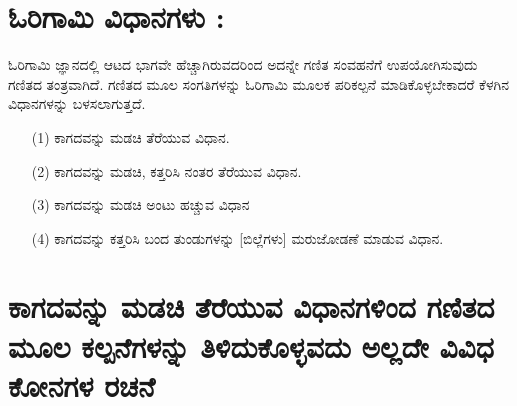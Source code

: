 \section{ಓರಿಗಾಮಿ ವಿಧಾನಗಳು : }\label{sec1.7} %
ಓರಿಗಾಮಿ ಜ್ಞಾನದಲ್ಲಿ ಆಟದ ಭಾಗವೇ ಹೆಚ್ಚಾಗಿರುವದರಿಂದ ಅದನ್ನೇ ಗಣಿತ ಸಂವಹನೆಗೆ ಉಪಯೋಗಿಸುವುದು ಗಣಿತದ ತಂತ್ರವಾಗಿದೆ. ಗಣಿತದ ಮೂಲ ಸಂಗತಿಗಳನ್ನು ಓರಿಗಾಮಿ ಮೂಲಕ ಪರಿಕಲ್ಪನೆ ಮಾಡಿಕೊಳ್ಳಬೇಕಾದರೆ ಕೆಳಗಿನ ವಿಧಾನಗಳನ್ನು ಬಳಸಲಾಗುತ್ತದೆ. 
\smallskip
\begin{itemize}
\item[(1)] ಕಾಗದವನ್ನು ಮಡಚಿ ತೆರೆಯುವ ವಿಧಾನ.
\smallskip
\item[(2)] ಕಾಗದವನ್ನು ಮಡಚಿ, ಕತ್ತರಿಸಿ ನಂತರ ತೆರೆಯುವ ವಿಧಾನ.
\smallskip
\item[(3)] ಕಾಗದವನ್ನು ಮಡಚಿ ಅಂಟು ಹಚ್ಚುವ ವಿಧಾನ
\smallskip
\item[(4)] ಕಾಗದವನ್ನು ಕತ್ತರಿಸಿ ಬಂದ ತುಂಡುಗಳನ್ನು [ಬಿಲ್ಲೆಗಳು] ಮರುಜೋಡಣೆ ಮಾಡುವ ವಿಧಾನ.
\end{itemize}

\section{ಕಾಗದವನ್ನು ಮಡಚಿ ತೆರೆಯುವ ವಿಧಾನಗಳಿಂದ ಗಣಿತದ ಮೂಲ ಕಲ್ಪನೆಗ\-ಳನ್ನು ತಿಳಿದುಕೊಳ್ಳವದು ಅಲ್ಲದೇ ವಿವಿಧ ಕೋನಗಳ ರಚನೆ}\label{sec1.8}%

